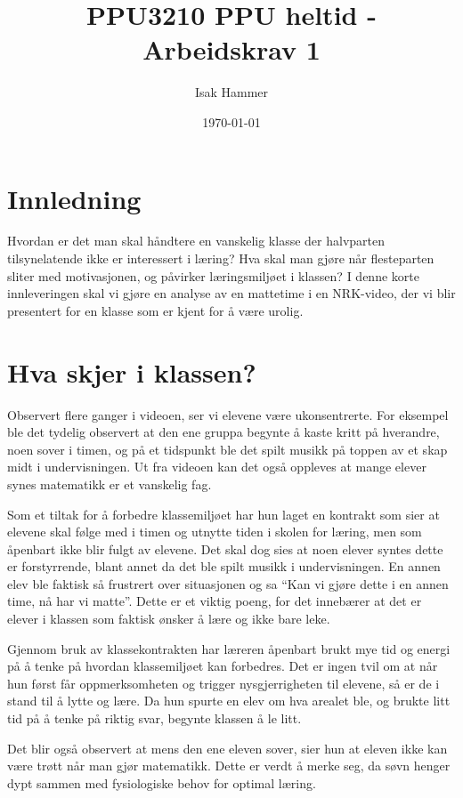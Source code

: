 \documentclass[12pt,a4paper]{article}
\title{PPU3210 PPU heltid - Arbeidskrav 1  }
\author{Isak Hammer}
\date{\today}
\begin{document}
\maketitle

\section*{Innledning}

Hvordan er det man skal håndtere en vanskelig klasse der halvparten tilsynelatende ikke er interessert i læring? Hva skal man gjøre når flesteparten sliter med motivasjonen, og påvirker læringsmiljøet i klassen? I denne korte innleveringen skal vi gjøre en analyse av en mattetime i en NRK-video, der vi blir presentert for en klasse som er kjent for å være urolig.

\section*{Hva skjer i klassen?}

Observert flere ganger i videoen, ser vi elevene være ukonsentrerte. For eksempel ble det tydelig observert at den ene gruppa begynte å kaste kritt på hverandre, noen sover i timen, og på et tidspunkt ble det spilt musikk på toppen av et skap midt i undervisningen. Ut fra videoen kan det også oppleves at mange elever synes matematikk er et vanskelig fag.

Som et tiltak for å forbedre klassemiljøet har hun laget en kontrakt som sier at elevene skal følge med i timen og utnytte tiden i skolen for læring, men som åpenbart ikke blir fulgt av elevene. Det skal dog sies at noen elever syntes dette er
forstyrrende, blant annet da det ble spilt musikk i undervisningen. En annen elev ble faktisk så frustrert over situasjonen og sa ``Kan vi gjøre dette i en annen time, nå har vi matte''. Dette er et viktig poeng, for det innebærer at det er elever i klassen som faktisk ønsker å lære og ikke bare leke.

Gjennom bruk av klassekontrakten har læreren åpenbart brukt mye tid og energi på å tenke på hvordan klassemiljøet kan forbedres. Det er ingen tvil om at når hun først får oppmerksomheten og trigger nysgjerrigheten til elevene, så er de i stand til å lytte og lære. Da hun spurte en elev om hva arealet ble, og brukte litt tid på å tenke på riktig svar, begynte klassen å le litt.

Det blir også observert at mens den ene eleven sover, sier hun at eleven ikke kan være trøtt når man gjør matematikk. Dette er verdt å merke seg, da søvn henger dypt sammen med fysiologiske behov for optimal læring. 
\end{document}
